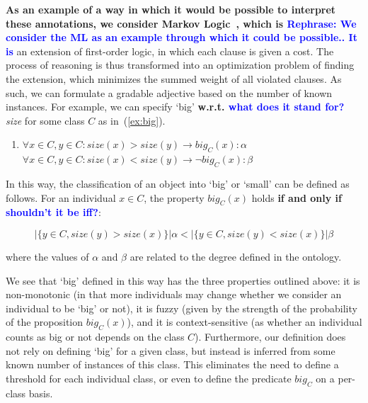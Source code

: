 \documentclass[11pt]{article}
\begin{document}
\textbf{As an example of a way in which it would be possible to interpret these 
annotations, we consider Markov Logic~\cite{richardson2006markov}, which is \textcolor{blue}{Rephrase: We consider the ML as an example through which it could be possible.. It is}} an 
extension of first-order logic, in which each clause is given a cost. The process 
of reasoning is thus transformed into an optimization problem of finding the 
extension, which minimizes the summed weight of all violated clauses. As such, we
can formulate a gradable adjective based on the number of known instances. 
For example, we can specify `big' \textbf{w.r.t. \textcolor{blue}{what does it stand for?}} \emph{size} for some class $C$ as in~(\ref{ex:big}).
%
\begin{enumerate}
\item $\forall x \in C, y \in C : size(x) > size(y) \rightarrow big_C(x) : \alpha$ \\
$\forall x \in C, y \in C : size(x) < size(y) \rightarrow \neg big_C(x) : \beta$
\label{ex:big}
\end{enumerate}
%
In this way, the classification of an object into `big' or `small' can be defined as follows.
For an individual $x \in C$, the property $big_C(x)$ holds \textbf{if and only if \textcolor{blue}{shouldn't it be iff?}}: 

\vspace{-1.0em}
$$|\{y \in C, size(y) > size(x)\}| \alpha < |\{y \in C, size(y) < size(x)\}| \beta$$
\vspace{-1.5em}

where the values of $\alpha$ and $\beta$ are related to the degree defined
in the ontology.

We see that `big' defined in this way has the three properties outlined above: 
it is non-monotonic (in that more individuals may change whether we consider an individual 
to be `big' or not), it is fuzzy (given by the strength of the probability of the proposition $big_C(x)$), 
and it is context-sensitive (as whether an individual counts as big or not depends on the class $C$). 
Furthermore, our definition does not rely on defining `big' for a given class, but instead is inferred
from some known number of instances of this class. This eliminates the need to
define a threshold for each individual class, or even to define the predicate $big_C$ on a per-class
basis.
\end{document}
